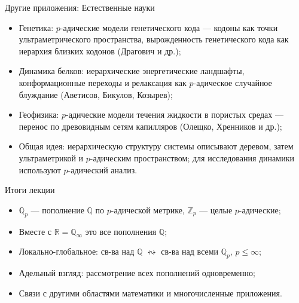 \documentclass[serif, aspectratio=169]{beamer}
\begin{document}
\begin{frame}{Другие приложения: Естественные науки}
    \begin{itemize}
        \item Генетика: $p$-адические модели генетического кода --- кодоны как точки ультраметрического пространства, вырожденность генетического кода как иерархия близких кодонов (Драгович и др.);
        \item Динамика белков: иерархические энергетические ландшафты, конформационные переходы и релаксация как $p$-адическое случайное блуждание (Аветисов, Бикулов, Козырев);
        \item Геофизика: $p$-адические модели течения жидкости в пористых средах --- перенос по древовидным сетям капилляров (Олещко, Хренников и др.);
        \item Общая идея: иерархическую структуру системы описывают деревом, затем ультраметрикой и $p$-адическим пространством; для исследования динамики используют $p$-адический анализ.
    \end{itemize}

    \note{
        \begin{itemize}
            \item ---
        \end{itemize}
    }
\end{frame}

\begin{frame}{Итоги лекции}
    \begin{itemize}
        \item $\mathbb{Q}_p$ --- пополнение $\mathbb{Q}$ по $p$-адической метрике, $\mathbb{Z}_p$ --- целые $p$-адические; 
        \item Вместе с $\mathbb{R}=\mathbb{Q}_\infty$ это все пополнения $\mathbb{Q}$;
        \item Локально-глобальное: св-ва над $\mathbb{Q}$ $\leftrightsquigarrow$ св-ва над всеми $\mathbb{Q}_p$, $p\leqslant\infty$;
        \item Адельный взгляд: рассмотрение всех пополнений одновременно;
        \item Связи с другими областями математики и многочисленные приложения.
    \end{itemize}
    \note{
        \begin{itemize}
            \item ---
        \end{itemize}
    }
\end{frame}
\end{document}
